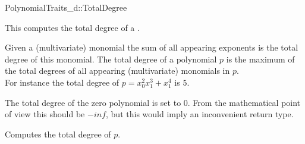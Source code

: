 \begin{ccRefConcept}{PolynomialTraits_d::TotalDegree}

\ccDefinition

This  computes the total degree 
of a . 

Given a (multivariate) monomial the sum of all appearing exponents 
is the total degree of this monomial. 
The total degree of a polynomial $p$ is the maximum of the total degrees 
of all appearing (multivariate) monomials in $p$.\\
For instance the total degree of $p = x_0^2x_1^3+x_1^4$ is $5$.

The total degree of the zero polynomial is set to $0$. 
From the mathematical point of view this should 
be $-inf$, but this would imply an inconvenient return type. 

 

\ccRefines 
{}


\ccTypes

\ccGlue
{}

\ccOperations
{}
         {Computes the total degree of $p$.}



\ccSeeAlso

\\
\\
\\

\end{ccRefConcept}
